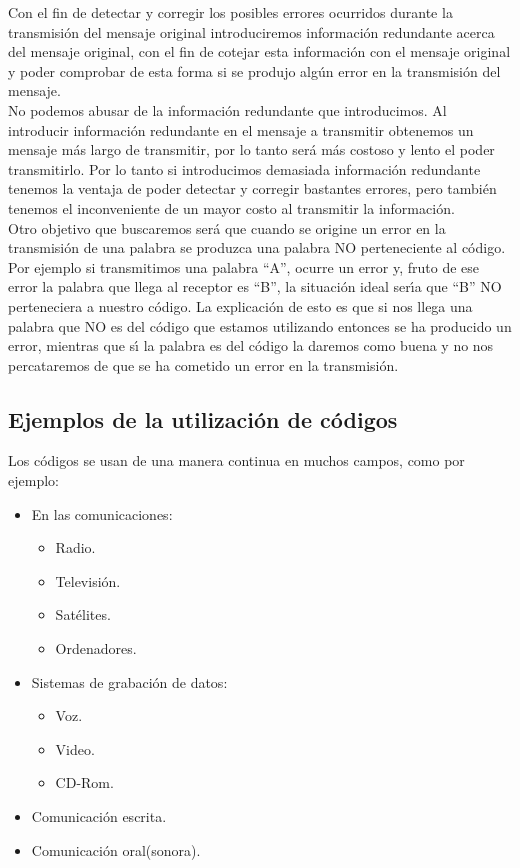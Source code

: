 Con el fin de detectar y corregir los posibles errores ocurridos durante la
transmisi\'on del mensaje original introduciremos informaci\'on redundante
acerca del mensaje original, con el fin de cotejar esta informaci\'on con el 
mensaje original y poder comprobar de esta forma si se produjo alg\'un error en
la transmisi\'on del mensaje.\\

No podemos abusar de la informaci\'on redundante que introducimos. Al
introducir informaci\'on redundante en el mensaje a transmitir obtenemos un
mensaje m\'as largo de transmitir, por lo tanto ser\'a m\'as costoso y lento
el poder transmitirlo. Por lo tanto si introducimos demasiada informaci\'on
redundante tenemos la ventaja de poder detectar y corregir bastantes errores,
pero tambi\'en tenemos el inconveniente de un mayor costo al transmitir la
informaci\'on.\\

Otro objetivo que buscaremos ser\'a que cuando se origine un error en la
transmisi\'on de una palabra se produzca una palabra NO perteneciente al
c\'odigo. Por ejemplo si transmitimos una palabra ``A'', ocurre un error y,
fruto de ese error la palabra que llega al receptor es ``B'', la situaci\'on
ideal ser\'{\i}a que ``B'' NO perteneciera a nuestro c\'odigo. La explicaci\'on
de esto es que si nos llega una palabra que NO es del c\'odigo que estamos
utilizando entonces se ha producido un error, mientras que s\'{\i} la palabra
es del c\'odigo la daremos como buena y no nos percataremos de que se ha 
cometido un error en la transmisi\'on.
%
\newpage
%
\subsection{Ejemplos de la utilizaci\'on de c\'odigos}

Los c\'odigos se usan de una manera continua en muchos campos, como por ejemplo:

\begin{itemize}
\item En las comunicaciones:
\begin{itemize}
\item Radio.
\item Televisi\'on.
\item Sat\'elites.
\item Ordenadores.
\end{itemize}
\item Sistemas de grabaci\'on de datos:
\begin{itemize}
\item Voz.
\item Video.
\item CD-Rom.
\end{itemize}
\item Comunicaci\'on escrita.
\item Comunicaci\'on oral(sonora).
\end{itemize}


